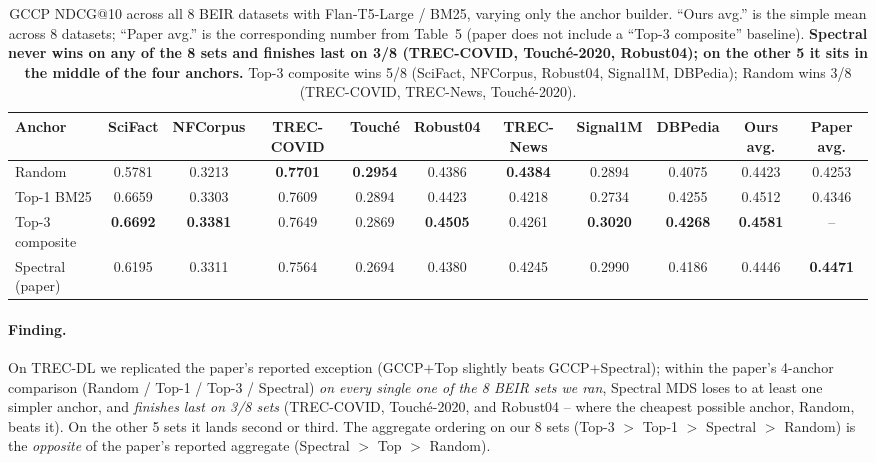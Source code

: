 \documentclass[sigconf]{acmart}
\begin{document}
\begin{table}[t]
\centering
\small
\setlength{\tabcolsep}{4pt}
\begin{tabular}{lcccccccc|cc}
\toprule
\textbf{Anchor} & SciFact & NFCorpus & TREC-COVID & Touch\'e & Robust04 & TREC-News & Signal1M & DBPedia & \textbf{Ours avg.} & \textbf{Paper avg.} \\
\midrule
Random           & 0.5781 & 0.3213 & \textbf{0.7701} & \textbf{0.2954} & 0.4386 & \textbf{0.4384} & 0.2894 & 0.4075 & 0.4423 & 0.4253 \\
Top-1 BM25       & 0.6659 & 0.3303 & 0.7609 & 0.2894 & 0.4423 & 0.4218 & 0.2734 & 0.4255 & 0.4512 & 0.4346 \\
Top-3 composite  & \textbf{0.6692} & \textbf{0.3381} & 0.7649 & 0.2869 & \textbf{0.4505} & 0.4261 & \textbf{0.3020} & \textbf{0.4268} & \textbf{0.4581} & --     \\
Spectral (paper) & 0.6195 & 0.3311 & 0.7564 & 0.2694 & 0.4380 & 0.4245 & 0.2990 & 0.4186 & 0.4446 & \textbf{0.4471} \\
\bottomrule
\end{tabular}
\caption{GCCP NDCG@10 across all 8 BEIR datasets with Flan-T5-Large /
BM25, varying only the anchor builder. ``Ours avg.'' is the simple
mean across 8 datasets; ``Paper avg.'' is the corresponding number
from \cite{long2025precise} Table~5 (paper does not include a
``Top-3 composite'' baseline). \textbf{Spectral never wins on any
of the 8 sets and finishes last on 3/8 (TREC-COVID, Touch\'e-2020,
Robust04); on the other 5 it sits in the middle of the four anchors.}
Top-3 composite wins 5/8 (SciFact, NFCorpus, Robust04, Signal1M,
DBPedia); Random wins 3/8 (TREC-COVID, TREC-News, Touch\'e-2020).}
\label{tab:beir-anchor}
\end{table}

\paragraph{Finding.} On TREC-DL we replicated the paper's reported
exception (GCCP+Top slightly beats GCCP+Spectral); within the
paper's 4-anchor comparison (Random / Top-1 / Top-3 / Spectral)
\emph{on every single one of the 8 BEIR sets we ran},
Spectral MDS loses to at least one simpler anchor, and
\emph{finishes last on 3/8 sets} (TREC-COVID, Touch\'e-2020, and
Robust04 -- where the cheapest possible anchor, Random, beats it).
On the other 5 sets it lands second or third. The aggregate
ordering on our 8 sets (Top-3 $>$ Top-1 $>$ Spectral $>$ Random)
is the \emph{opposite} of the paper's reported aggregate (Spectral
$>$ Top $>$ Random).
\end{document}
